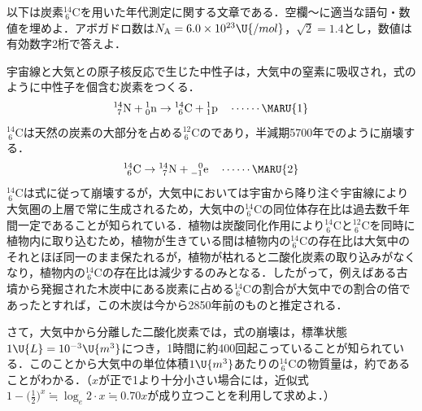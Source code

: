 
\hspace{1zw}以下は炭素${}^{14}_{\ 6}\mathrm{C}$を用いた年代測定に関する文章である．空欄〜に適当な語句・数値を埋めよ．アボガドロ数は$N_{\mathrm{A}}=6.0\times 10^{23}\U{/mol}$，$\sqrt{2}=1.4$とし，数値は有効数字2桁で答えよ．
\par
\hspace{1zw}宇宙線と大気との原子核反応で生じた中性子は，大気中の窒素に吸収され，式のように中性子を個含む炭素をつくる．
\[{}^{14}_{\ 7}\mathrm{N}+{}^1_0\mathrm{n}\to{}^{14}_{\ 6}\mathrm{C}+{}^1_1\mathrm{p}\quad\cdots\cdots\text{\MARU{1}}\]
${}^{14}_{\ 6}\mathrm{C}$は天然の炭素の大部分を占める${}^{12}_{\ 6}\mathrm{C}$のであり，半減期5700年でのように崩壊する．
\[{}^{14}_{\ 6}\mathrm{C}\to{}^{14}_{\ 7}\mathrm{N}+{}^{\ \ 0}_{-1}\mathrm{e}\quad\cdots\cdots\text{\MARU{2}}\]
\hspace{1zw}${}^{14}_{\ 6}\mathrm{C}$は式に従って崩壊するが，大気中においては宇宙から降り注ぐ宇宙線により大気圏の上層で常に生成されるため，大気中の${}^{14}_{\ 6}\mathrm{C}$の同位体存在比は過去数千年間一定であることが知られている．植物は炭酸同化作用により${}^{14}_{\ 6}\mathrm{C}$と${}^{12}_{\ 6}\mathrm{C}$を同時に植物内に取り込むため，植物が生きている間は植物内の${}^{14}_{\ 6}\mathrm{C}$の存在比は大気中のそれとほぼ同一のまま保たれるが，植物が枯れると二酸化炭素の取り込みがなくなり，植物内の${}^{14}_{\ 6}\mathrm{C}$の存在比は減少するのみとなる．したがって，例えばある古墳から発掘された木炭中にある炭素に占める${}^{14}_{\ 6}\mathrm{C}$の割合が大気中での割合の倍であったとすれば，この木炭は今から2850年前のものと推定される．
\par
\hspace{1zw}さて，大気中から分離した二酸化炭素では，式の崩壊は，標準状態$1\U{L}=10^{-3}\U{m^3}$につき，1時間に約400回起こっていることが知られている．このことから大気中の単位体積$1\U{m^3}$あたりの${}^{14}_{\ 6}\mathrm{C}$の物質量は，約であることがわかる．（$x$が正で1より十分小さい場合には，近似式$1-\bigl(\frac{1}{2}\bigr)^x\fallingdotseq\log_e 2\cdot x\fallingdotseq 0.70x$が成り立つことを利用して求めよ．）

\filbreak
{}


